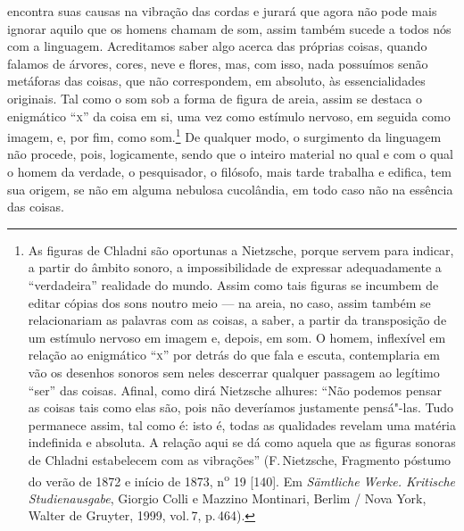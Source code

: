 encontra suas causas na vibração
das cordas e jurará que agora não pode mais ignorar aquilo que os
homens chamam de som, assim também sucede a todos nós com a
linguagem. Acreditamos saber algo acerca das próprias coisas, quando
falamos de árvores, cores, neve e flores, mas, com isso, nada possuímos
senão metáforas das coisas, que não correspondem, em absoluto, às
essencialidades originais. Tal como o som sob a forma de figura de
areia, assim se destaca o enigmático ``\textsc{x}'' da coisa em si, uma vez como
estímulo nervoso, em seguida como imagem, e, por fim, como
som.\footnote{ As figuras de Chladni são oportunas a Nietzsche, porque
servem para indicar, a partir do âmbito sonoro, a impossibilidade de
expressar adequadamente a “verdadeira” realidade do mundo. Assim como
tais figuras se incumbem de editar cópias dos sons noutro meio --- na
areia, no caso, assim também se relacionariam as palavras com as
coisas, a saber, a partir da transposição de um estímulo nervoso em
imagem e, depois, em som. O homem, inflexível em relação ao enigmático
“\textsc{x}” por detrás do que fala e escuta, contemplaria em vão os desenhos
sonoros sem neles descerrar qualquer passagem ao legítimo “ser” das
coisas. Afinal, como dirá Nietzsche alhures: “Não podemos pensar as coisas
tais como elas são, pois não deveríamos justamente pensá"-las. Tudo
permanece assim, tal como é: isto é, todas as qualidades revelam uma
matéria indefinida e absoluta. A relação aqui se dá como aquela que
as figuras sonoras de Chladni estabelecem com as vibrações” (F.\,Nietzsche,
Fragmento póstumo do verão de 1872 e início de 1873, n\textsuperscript{o} 19 [140].
Em \textit{Sämtliche Werke. Kritische Studienausgabe}, Giorgio
Colli e Mazzino Montinari, Berlim / Nova York, Walter de Gruyter, 1999,
vol.\,7, p.\,464).} De qualquer modo, o surgimento da linguagem não
procede, pois, logicamente, sendo que o inteiro material no qual e com
o qual o homem da verdade, o pesquisador, o filósofo, mais tarde
trabalha e edifica, tem sua origem, se não em alguma nebulosa
cucolândia, em todo caso não na essência das coisas.

